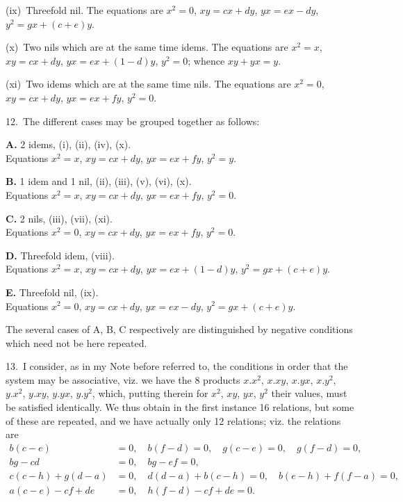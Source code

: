 \documentclass[11pt,a4paper]{book}
\begin{document}
(ix)~Threefold nil. The equations are $x^2=0$, $xy=cx+dy$, $yx=ex-dy$, $y^2=gx+(c+e)y$.

(x)~Two nils which are at the same time idems. The equations are $x^2=x$, $xy=cx+dy$, $yx=ex+(1-d)y$, $y^2=0$; whence $xy+yx=y$.

(xi)~Two idems which are at the same time nils. The equations are $x^2=0$, $xy=cx+dy$, $yx=ex+fy$, $y^2=0$.

12.~The different cases may be grouped together as follows:

\begin{center}
\textbf{A.} 2 idems, (i), (ii), (iv), (x).\\[0.3em]
Equations $x^2=x$, $xy=cx+dy$, $yx=ex+fy$, $y^2=y$.

\medskip
\textbf{B.} 1 idem and 1 nil, (ii), (iii), (v), (vi), (x).\\[0.3em]
Equations $x^2=x$, $xy=cx+dy$, $yx=ex+fy$, $y^2=0$.

\medskip
\textbf{C.} 2 nils, (iii), (vii), (xi).\\[0.3em]
Equations $x^2=0$, $xy=cx+dy$, $yx=ex+fy$, $y^2=0$.

\medskip
\textbf{D.} Threefold idem, (viii).\\[0.3em]
Equations $x^2=x$, $xy=cx+dy$, $yx=ex+(1-d)y$, $y^2=gx+(c+e)y$.

\medskip
\textbf{E.} Threefold nil, (ix).\\[0.3em]
Equations $x^2=0$, $xy=cx+dy$, $yx=ex-dy$, $y^2=gx+(c+e)y$.
\end{center}

The several cases of A, B, C respectively are distinguished by negative conditions which need not be here repeated.

13.~I consider, as in my Note before referred to, the conditions in order that the system may be associative, viz. we have the 8 products $x.x^2$, $x.xy$, $x.yx$, $x.y^2$, $y.x^2$, $y.xy$, $y.yx$, $y.y^2$, which, putting therein for $x^2$, $xy$, $yx$, $y^2$ their values, must be satisfied identically. We thus obtain in the first instance 16 relations, but some of these are repeated, and we have actually only 12 relations; viz. the relations are
\begin{align*}
b(c-e) &= 0,\quad b(f-d)=0,\quad g(c-e)=0,\quad g(f-d)=0,\\
bg-cd &= 0,\quad bg-ef=0,\\
c(c-h)+g(d-a) &= 0,\quad d(d-a)+b(c-h)=0,\quad b(e-h)+f(f-a)=0,\\
a(c-e)-cf+de &= 0,\quad h(f-d)-cf+de=0.
\end{align*}
\end{document}
